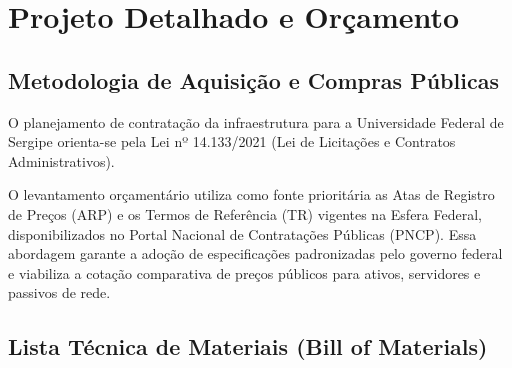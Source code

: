 
\chapter{Projeto Detalhado e Orçamento}
\label{cap:projeto_detalhado}

\section{Metodologia de Aquisição e Compras Públicas}

O planejamento de contratação da infraestrutura para a Universidade Federal de Sergipe orienta-se pela Lei nº 14.133/2021 (Lei de Licitações e Contratos Administrativos). 

O levantamento orçamentário utiliza como fonte prioritária as Atas de Registro de Preços (ARP) e os Termos de Referência (TR) vigentes na Esfera Federal, disponibilizados no Portal Nacional de Contratações Públicas (PNCP). Essa abordagem garante a adoção de especificações padronizadas pelo governo federal e viabiliza a cotação comparativa de preços públicos para ativos, servidores e passivos de rede.

\section{Lista Técnica de Materiais (Bill of Materials)}

